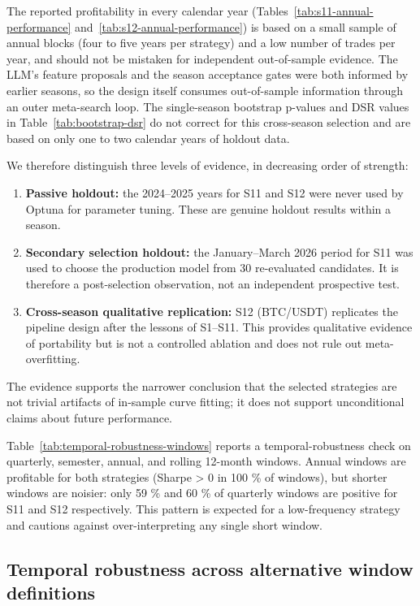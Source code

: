 \documentclass[analytics,article,submit,pdftex,moreauthors]{Definitions/mdpi}
\begin{document}
The reported profitability in every calendar year (Tables~\ref{tab:s11-annual-performance} and~\ref{tab:s12-annual-performance}) is based on a small sample of annual blocks (four to five years per strategy) and a low number of trades per year, and should not be mistaken for independent out-of-sample evidence. The LLM's feature proposals and the season acceptance gates were both informed by earlier seasons, so the design itself consumes out-of-sample information through an outer meta-search loop. The single-season bootstrap p-values and DSR values in Table~\ref{tab:bootstrap-dsr} do not correct for this cross-season selection and are based on only one to two calendar years of holdout data.

We therefore distinguish three levels of evidence, in decreasing order of strength:

\begin{enumerate}
\def\labelenumi{\arabic{enumi}.}
\item
  \textbf{Passive holdout:} the 2024--2025 years for S11 and S12 were never used by Optuna for parameter tuning. These are genuine holdout results within a season.
\item
  \textbf{Secondary selection holdout:} the January--March 2026 period for S11 was used to choose the production model from 30 re-evaluated candidates. It is therefore a post-selection observation, not an independent prospective test.
\item
  \textbf{Cross-season qualitative replication:} S12 (BTC/USDT) replicates the pipeline design after the lessons of S1--S11. This provides qualitative evidence of portability but is not a controlled ablation and does not rule out meta-overfitting.
\end{enumerate}

The evidence supports the narrower conclusion that the selected strategies are not trivial artifacts of in-sample curve fitting; it does not support unconditional claims about future performance.

Table~\ref{tab:temporal-robustness-windows} reports a temporal-robustness check on quarterly, semester, annual, and rolling 12-month windows. Annual windows are profitable for both strategies (Sharpe \textgreater{} 0 in 100 \% of windows), but shorter windows are noisier: only 59 \% and 60 \% of quarterly windows are positive for S11 and S12 respectively. This pattern is expected for a low-frequency strategy and cautions against over-interpreting any single short window.

\subsection{Temporal robustness across alternative window definitions}\label{table-10-temporal-robustness-across-alternative-window-definitions}
\end{document}
